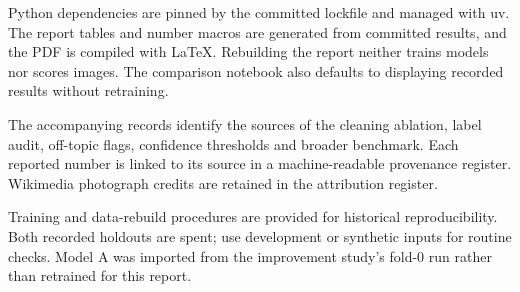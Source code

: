 \documentclass[11pt,a4paper]{article}
\begin{document}
Python dependencies are pinned by the committed lockfile and managed with uv. The report tables and number macros
are generated from committed results, and the PDF is compiled with LaTeX. Rebuilding the report neither trains
models nor scores images. The comparison notebook also defaults to displaying recorded results without retraining.

The accompanying records identify the sources of the cleaning ablation, label audit, off-topic flags, confidence
thresholds and broader benchmark. Each reported number is linked to its source in a machine-readable provenance
register. Wikimedia photograph credits are retained in the attribution register.

Training and data-rebuild procedures are provided for historical reproducibility. Both recorded holdouts are spent;
use development or synthetic inputs for routine checks. Model A was imported from the improvement study's fold-0 run
rather than retrained for this report.
\end{document}
